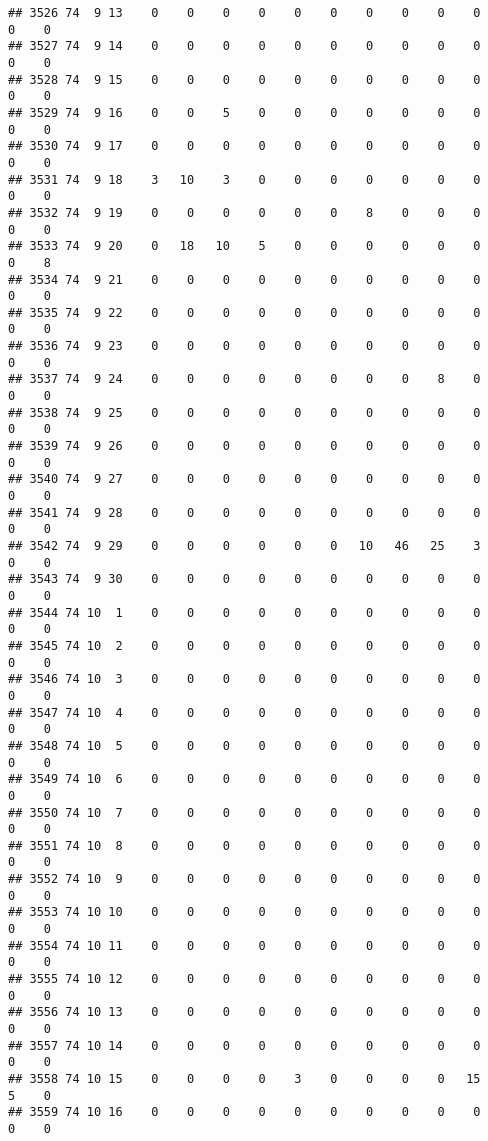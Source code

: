 \documentclass[]{article}
\begin{document}
\begin{verbatim}
## 3526 74  9 13    0    0    0    0    0    0    0    0    0    0    0    0
## 3527 74  9 14    0    0    0    0    0    0    0    0    0    0    0    0
## 3528 74  9 15    0    0    0    0    0    0    0    0    0    0    0    0
## 3529 74  9 16    0    0    5    0    0    0    0    0    0    0    0    0
## 3530 74  9 17    0    0    0    0    0    0    0    0    0    0    0    0
## 3531 74  9 18    3   10    3    0    0    0    0    0    0    0    0    0
## 3532 74  9 19    0    0    0    0    0    0    8    0    0    0    0    0
## 3533 74  9 20    0   18   10    5    0    0    0    0    0    0    0    8
## 3534 74  9 21    0    0    0    0    0    0    0    0    0    0    0    0
## 3535 74  9 22    0    0    0    0    0    0    0    0    0    0    0    0
## 3536 74  9 23    0    0    0    0    0    0    0    0    0    0    0    0
## 3537 74  9 24    0    0    0    0    0    0    0    0    8    0    0    0
## 3538 74  9 25    0    0    0    0    0    0    0    0    0    0    0    0
## 3539 74  9 26    0    0    0    0    0    0    0    0    0    0    0    0
## 3540 74  9 27    0    0    0    0    0    0    0    0    0    0    0    0
## 3541 74  9 28    0    0    0    0    0    0    0    0    0    0    0    0
## 3542 74  9 29    0    0    0    0    0    0   10   46   25    3    0    0
## 3543 74  9 30    0    0    0    0    0    0    0    0    0    0    0    0
## 3544 74 10  1    0    0    0    0    0    0    0    0    0    0    0    0
## 3545 74 10  2    0    0    0    0    0    0    0    0    0    0    0    0
## 3546 74 10  3    0    0    0    0    0    0    0    0    0    0    0    0
## 3547 74 10  4    0    0    0    0    0    0    0    0    0    0    0    0
## 3548 74 10  5    0    0    0    0    0    0    0    0    0    0    0    0
## 3549 74 10  6    0    0    0    0    0    0    0    0    0    0    0    0
## 3550 74 10  7    0    0    0    0    0    0    0    0    0    0    0    0
## 3551 74 10  8    0    0    0    0    0    0    0    0    0    0    0    0
## 3552 74 10  9    0    0    0    0    0    0    0    0    0    0    0    0
## 3553 74 10 10    0    0    0    0    0    0    0    0    0    0    0    0
## 3554 74 10 11    0    0    0    0    0    0    0    0    0    0    0    0
## 3555 74 10 12    0    0    0    0    0    0    0    0    0    0    0    0
## 3556 74 10 13    0    0    0    0    0    0    0    0    0    0    0    0
## 3557 74 10 14    0    0    0    0    0    0    0    0    0    0    0    0
## 3558 74 10 15    0    0    0    0    3    0    0    0    0   15    5    0
## 3559 74 10 16    0    0    0    0    0    0    0    0    0    0    0    0

\end{verbatim}
\end{document}
